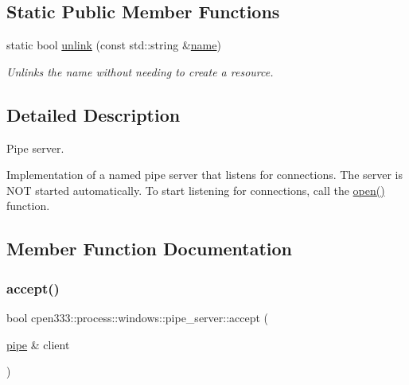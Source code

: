\subsection*{Static Public Member Functions}
\begin{DoxyCompactItemize}
\item 
static bool \hyperlink{classcpen333_1_1process_1_1windows_1_1pipe__server_a33351b0b15900c6238d592b9642b1f68}{unlink} (const std\+::string \&\hyperlink{classcpen333_1_1process_1_1impl_1_1named__resource__base_a53986a0a1dd26a3602b842c45613b79d}{name})
\begin{DoxyCompactList}\small\item\em Unlinks the name without needing to create a resource. \end{DoxyCompactList}\end{DoxyCompactItemize}


\subsection{Detailed Description}
Pipe server. 

Implementation of a named pipe server that listens for connections. The server is N\+OT started automatically. To start listening for connections, call the \hyperlink{classcpen333_1_1process_1_1windows_1_1pipe__server_a3d44407143efc64e27b5b6455ad8ae8c}{open()} function. 

\subsection{Member Function Documentation}
\mbox{\label{classcpen333_1_1process_1_1windows_1_1pipe__server_ab46c9f9214309d9d8bd8115758863259}} 
\subsubsection{\texorpdfstring{accept()}{accept()}}
{\footnotesize\ttfamily bool cpen333\+::process\+::windows\+::pipe\+\_\+server\+::accept (\begin{DoxyParamCaption}\item[{\hyperlink{classcpen333_1_1process_1_1windows_1_1pipe}{pipe} \&}]{client }\end{DoxyParamCaption})\hspace{0.3cm}{\ttfamily [inline]}}



